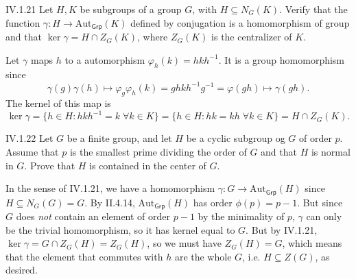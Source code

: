 \begin{problem}{IV.1.21}
Let $H,K$ be subgroups of a group $G$, with $H \subseteq N_G(K)$. Verify that the function $\gamma: H \to \text{Aut}_\mathsf{Grp}(K)$ defined by conjugation is a homomorphism of group and that $\ker \gamma = H \cap Z_G(K)$, where $Z_G(K)$ is the centralizer of $K$.	
\end{problem}
\begin{pf}
Let $\gamma$ maps $h$ to a automorphism $\varphi_h(k) = hkh^{-1}$. It is a group homomorphism since
\[
\gamma(g)\gamma(h) \mapsto \varphi_g \varphi_h(k) = ghkh^{-1}g^{-1} = \varphi(gh) \mapsto \gamma(gh).
\]
The kernel of this map is 
\[
\ker \gamma = \{h \in H: hkh^{-1} = k \; \forall k \in K\} = \{h \in H: hk = kh \; \forall k \in K\} = H \cap Z_G(K).	
\]
\end{pf}

\begin{problem}{IV.1.22}
Let $G$ be a finite group, and let $H$ be a cyclic subgroup og $G$ of order $p$. Assume that $p$ is the smallest prime dividing the order of $G$ and that $H$ is normal in $G$. Prove that $H$ is contained in the center of $G$.
\end{problem}
\begin{pf}
In the sense of IV.1.21, we have a homomorphism $\gamma:G \to \text{Aut}_\mathsf{Grp}(H)$ since $H \subseteq N_G(G) = G$. By II.4.14, $\text{Aut}_\mathsf{Grp}(H)$ has order $\phi(p)=p-1$. But since $G$ does \emph{not} contain an element of order $p-1$ by the minimality of $p$, $\gamma$ can only be the trivial homomorphism, so it has kernel equal to $G$. But by IV.1.21, $\ker \gamma = G \cap Z_G(H) = Z_G(H)$, so we must have $Z_G(H) = G$, which means that the element that commutes with $h$ are the whole $G$, i.e. $H \subseteq Z(G)$, as desired. 
\end{pf}

\section{}

